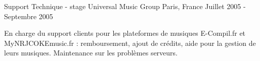 \cventry
{Support Technique - stage} %
{Universal Music Group} %
{Paris, France} %
{Juillet 2005 - Septembre 2005} %
{
\begin{cvitems} %
    \item
    {
        En charge du support clients pour les plateformes de musiques
        E-Compil.fr et MyNRJCOKEmusic.fr : remboursement, ajout de crédits,
        aide pour la gestion de leurs musiques.
        Maintenance sur les problèmes serveurs.
    }
\end{cvitems}
}